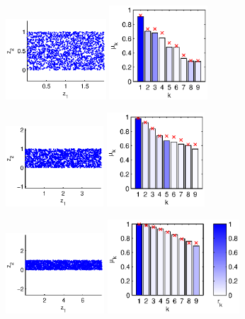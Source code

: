 \documentclass[preprint]{elsarticle}
\begin{document}
\begin{figure}[t]
\centering
\begin{subfigure}{0.3\textwidth}
\includegraphics[height=3cm]{strip_data_L2}
\includegraphics[height=3.5cm]{strip_spectrum_L2}
\caption{}
\end{subfigure}
%
\begin{subfigure}{0.3\textwidth}
\includegraphics[height=3cm]{strip_data_L4}
\includegraphics[height=3.5cm]{strip_spectrum_L4}
\caption{}
\end{subfigure}
%
\begin{subfigure}{0.35\textwidth}
\includegraphics[height=3cm]{strip_data_L8}
\includegraphics[height=3.5cm]{strip_spectrum_L8}

\end{subfigure}
\end{figure}
\end{document}
